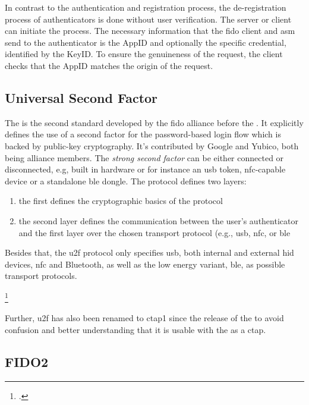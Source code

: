 In contrast to the authentication and registration process, the de-registration process of authenticators is done without user verification. The server or client can initiate the process. The necessary information that the \gls{fido} client and \gls{asm} send to the authenticator is the AppID and optionally the specific credential, identified by the KeyID. To ensure the genuineness of the request, the client checks that the AppID matches the origin of the request.

\subsection{Universal Second Factor}

The  is the second standard developed by the \gls{fido} alliance before the \wa. It explicitly defines the use of a second factor for the password-based login flow which is backed by public-key cryptography. It's contributed by Google and Yubico, both being alliance members. The \textit{strong second factor} can be either connected or disconnected, e.g, built in hardware or for instance an \gls{usb} token, \gls{nfc}-capable device or a standalone \gls{ble} dongle. The protocol defines two layers:

\begin{enumerate}
	\item the first defines the cryptographic basics of the protocol
	\item the second layer defines the communication between the user's authenticator and the first layer over the chosen transport protocol (e.g., \gls{usb}, \gls{nfc}, or \gls{ble}
\end{enumerate}

Besides that, the \gls{u2f} protocol only specifies \gls{usb}, both internal and external \gls{hid} devices, \gls{nfc} and Bluetooth, as well as the low energy variant, \gls{ble}, as possible transport protocols.

\footcites[See][1--2, 4]{u2f-overview}[See][4]{u2f-js-api}

Further, \gls{u2f} has also been renamed to \gls{ctap}1 since the release of the \wa{} to avoid confusion and better understanding that it is usable with the \wa{} as a \gls{ctap}.

\subsection{FIDO2}

